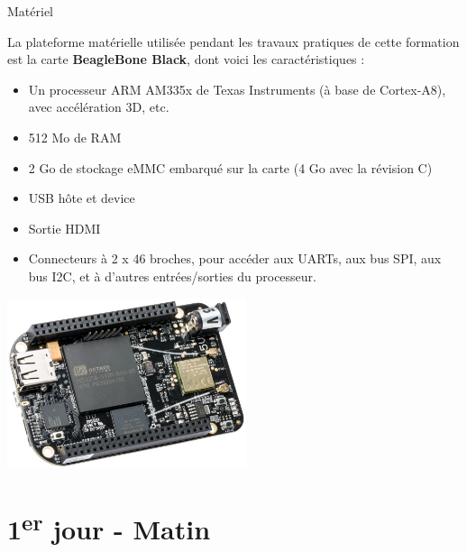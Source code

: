 \documentclass[a4paper,12pt,obeyspaces,spaces,hyphens]{article}
\begin{document}
\normalsize

\feagendatwocolumn
{Matériel}
{
  La plateforme matérielle utilisée pendant les travaux pratiques de
  cette formation est la carte {\bf BeagleBone Black}, dont voici les
  caractéristiques :

  \begin{itemize}
  \item Un processeur ARM AM335x de Texas Instruments (à base de
    Cortex-A8), avec accélération 3D, etc.
  \item 512 Mo de RAM
  \item 2 Go de stockage eMMC embarqué sur la carte
	\newline(4 Go avec la révision C)
  \item USB hôte et device
  \item Sortie HDMI
  \item Connecteurs à 2 x 46 broches, pour accéder aux UARTs, aux
        bus SPI, aux bus I2C, et à d'autres entrées/sorties du
        processeur.
  \end{itemize}
}
{}
{
  \begin{center}
    \includegraphics[height=5cm]{../slides/beagleboneblack-board/beagleboneblack.png}
  \end{center}
}

\section{1\textsuperscript{er} jour - Matin}
\end{document}
